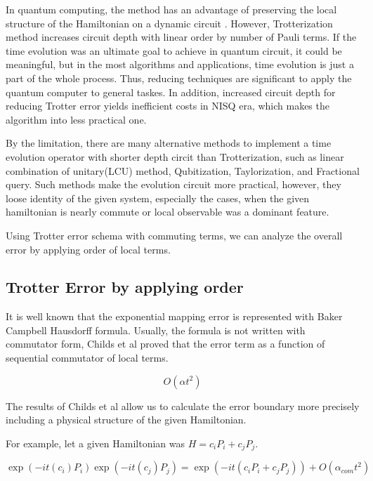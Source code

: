 \documentclass[a4paper,12pt]{article}
\begin{document}
In quantum computing, the method has an advantage of preserving the local structure of 
the Hamiltonian on a dynamic circuit \cite{childs_theory_2021}.
However, Trotterization method increases circuit depth with linear order by number of Pauli terms.
If the time evolution was an ultimate goal to achieve in quantum circuit, 
it could be meaningful, but in the most algorithms and applications, time evolution 
is just a part of the whole process. 
Thus, reducing techniques are significant to apply the quantum computer to general taskes.
In addition, increased circuit depth for reducing Trotter error yields 
inefficient costs in NISQ era, which makes the algorithm into less practical one.

By the limitation, there are many alternative methods to implement a time evolution operator 
with shorter depth circit than Trotterization, such as 
linear combination of unitary(LCU) method\cite{dewolf2023quantumcomputinglecturenotes}, Qubitization\cite{Low_2019}, 
Taylorization\cite{PhysRevLett.114.090502}, and Fractional query\cite{Berry_2014}.
Such methods make the evolution circuit more practical, however, they loose 
identity of the given system, especially the cases, when the given hamiltonian is nearly commute
or local observable was a dominant feature\cite{childs_theory_2021}. 

Using Trotter error schema with commuting terms, 
we can analyze the overall error by applying order of local terms.


\subsection{Trotter Error by applying order}

It is well known that the exponential mapping error is represented with Baker Campbell Hausdorff formula.
Usually, the formula is not written with commutator form, Childs et al proved that the error term 
as a function of sequential commutator of local terms\cite{childs_theory_2021}.

\begin{equation}
    O(\alpha t^2)
\end{equation}

The results of Childs et al allow us to calculate 
the error boundary more precisely including a physical structure 
of the given Hamiltonian.

For example, let a given Hamiltonian was $H = c_i P_i + c_j P_j$.

\begin{equation}
    \exp(-it (c_i) P_i) \exp(-it (c_j) P_j) = \exp(- it (c_i P_i + c_j P_j)) + O (\alpha_{com}t^2)
\end{equation}
\end{document}
